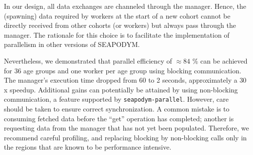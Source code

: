 \documentclass[a4paper,oneside,12pt]{article}
\begin{document}
In our design, all data exchanges are channeled through the manager. 
Hence, the (spawning) data required by workers at the start of a new cohort cannot be directly received from other 
cohorts (or workers) but always pass through the manager. The rationale for this choice is to facilitate the implementation of parallelism
in other versions of SEAPODYM.

Nevertheless, we demonstrated that parallel efficiency of $\approx 84$ \% can be achieved for 36 age groups and one worker per age group using blocking communication. 
The manager's execution time dropped from 60 to 2 seconds, approximately a $30$x speedup. Additional gains can potentially
be attained by using non-blocking communication, a feature supported by \verb|seapodym-parallel|. However, care should be taken to ensure 
correct synchronization. A common mistake is to consuming fetched data before the ``get'' operation has completed; another
is requesting data from the manager that has not yet been populated. Therefore, we recommend careful profiling, and replacing blocking by
non-blocking calls only in the regions that are known to be performance intensive.
\end{document}
